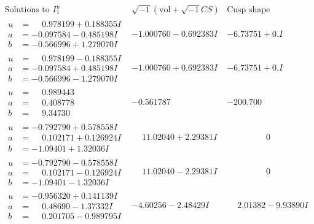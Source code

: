 \documentclass[1p]{elsarticle_modified}
\theoremstyle{definition}
\newcommand{\I}{\sqrt{-1}}
\begin{document}
$$\begin{array}{c|c|c}  
\text{Solutions to }I^u_{1}& \I (\text{vol} + \sqrt{-1}CS) & \text{Cusp shape}\\
 \hline 
\begin{aligned}
u &= \phantom{-}0.978199 + 0.188355 I \\
a &= -0.097584 - 0.485198 I \\
b &= -0.566996 + 1.279070 I\end{aligned}
 & -1.000760 - 0.692383 I & -6.73751 + 0. I\phantom{ +0.000000I} \\ \hline\begin{aligned}
u &= \phantom{-}0.978199 - 0.188355 I \\
a &= -0.097584 + 0.485198 I \\
b &= -0.566996 - 1.279070 I\end{aligned}
 & -1.000760 + 0.692383 I & -6.73751 + 0. I\phantom{ +0.000000I} \\ \hline\begin{aligned}
u &= \phantom{-}0.989443\phantom{ +0.000000I} \\
a &= \phantom{-}0.408778\phantom{ +0.000000I} \\
b &= \phantom{-}9.34730\phantom{ +0.000000I}\end{aligned}
 & -0.561787\phantom{ +0.000000I} & -200.700\phantom{ +0.000000I} \\ \hline\begin{aligned}
u &= -0.792790 + 0.578558 I \\
a &= \phantom{-}0.102171 + 0.126924 I \\
b &= -1.09401 + 1.32036 I\end{aligned}
 & \phantom{-}11.02040 + 2.29381 I & \phantom{-0.000000 } 0 \\ \hline\begin{aligned}
u &= -0.792790 - 0.578558 I \\
a &= \phantom{-}0.102171 - 0.126924 I \\
b &= -1.09401 - 1.32036 I\end{aligned}
 & \phantom{-}11.02040 - 2.29381 I & \phantom{-0.000000 } 0 \\ \hline\begin{aligned}
u &= -0.956320 + 0.141139 I \\
a &= \phantom{-}0.48690 - 1.37332 I \\
b &= \phantom{-}0.201705 - 0.989795 I\end{aligned}
 & -4.60256 - 2.48429 I & \phantom{-}2.01382 - 9.93890 I \\ \hline\begin{aligned}

\end{aligned}
\end{array}$$
\end{document}
